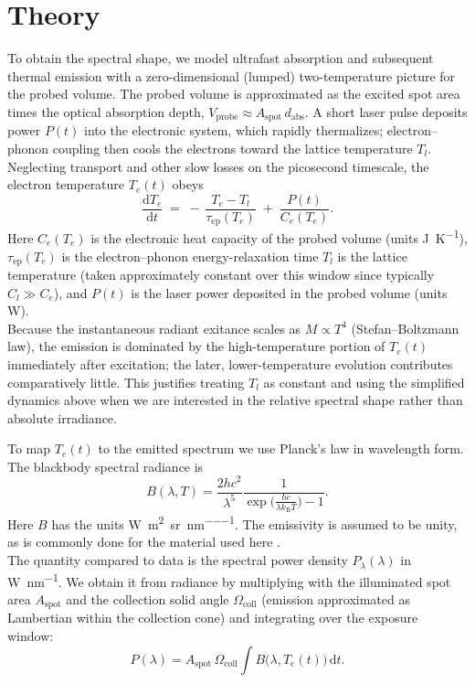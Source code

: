 \documentclass[
	parskip=half,
	a4paper,
]{scrarticle}
\begin{document}
\section{Theory}
To obtain the spectral shape, we model ultrafast absorption and subsequent thermal emission with a zero-dimensional (lumped) two-temperature picture for the probed volume. The probed volume is approximated as the excited spot area times the optical absorption depth, \(V_{\text{probe}} \approx A_{\text{spot}}\,d_{\text{abs}}\). A short laser pulse deposits power \(P(t)\) into the electronic system, which rapidly thermalizes; electron–phonon coupling then cools the electrons toward the lattice temperature \(T_l\). Neglecting transport and other slow losses on the picosecond timescale, the electron temperature \(T_e(t)\) obeys
\begin{equation}
    \frac{\mathrm d T_e}{\mathrm d t}
    \;=\;
    -\,\frac{T_e - T_l}{\tau_{\mathrm{ep}}(T_e)}
    \;+\;
    \frac{P(t)}{C_e(T_e)}.
    \label{eq:Te}
\end{equation}
Here \(C_e(T_e)\) is the electronic heat capacity of the probed volume (units \si{J\per K}), \(\tau_{\mathrm{ep}}(T_e)\) is the electron–phonon energy-relaxation time \(T_l\) is the lattice temperature (taken approximately constant over this window since typically \(C_l \gg C_e\)), and \(P(t)\) is the laser power deposited in the probed volume (units \si{W}).\\
Because the instantaneous radiant exitance scales as \(M \propto T^4\) (Stefan–Boltzmann law), the emission is dominated by the high-temperature portion of \(T_e(t)\) immediately after excitation; the later, lower-temperature evolution contributes comparatively little. This justifies treating \(T_l\) as constant and using the simplified dynamics above when we are interested in the relative spectral shape rather than absolute irradiance.

To map \(T_e(t)\) to the emitted spectrum we use Planck’s law in wavelength form. The blackbody spectral radiance is
\begin{equation}
    B(\lambda,T)
    = \frac{2hc^{2}}{\lambda^{5}}
      \frac{1}{\exp\bigl(\tfrac{hc}{\lambda k_{\mathrm B}T}\bigr)-1}.
    \label{eq:B}
\end{equation}
Here \(B\) has the units \si{\watt\per\metre\squared\per\steradian\per\nano\metre}. The emissivity is assumed to be unity, as is commonly done for the material used here \cite{sapritsky_black-body_1995}.\\
The quantity compared to data is the spectral power density \(P_\lambda(\lambda)\) in \si{\watt\per\nano\metre}. We obtain it from radiance by multiplying with the illuminated spot area \(A_{\text{spot}}\) and the collection solid angle \(\Omega_{\text{coll}}\) (emission approximated as Lambertian within the collection cone) and integrating over the exposure window:
\begin{equation}
      P(\lambda) = A_{\text{spot}}\,\Omega_{\text{coll}}
      \int B\bigl(\lambda, T_e(t)\bigr)\,\mathrm dt.
      \label{eq:P}
\end{equation}
\end{document}
